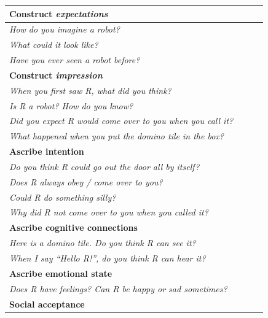 \documentclass{sig-alternate}
\begin{document}
\begin{table}[h]
\centering
\footnotesize
\begin{tabular}{p{0.9\linewidth}}
    \toprule
    \textbf{Construct \emph{expectations}} \\
    \midrule

    \emph{How do you imagine a robot?} \\
    \emph{What could it look like?} \\
    \emph{Have you ever seen a robot before?} \\

    \toprule
    \textbf{Construct \emph{impression}} \\
    \midrule


    \emph{When you first saw R, what did you think?} \\
    \emph{Is R a robot? How do you know?} \\
    \emph{Did you expect R would come over to you when you call it?} \\
    \emph{What happened when you put the domino tile in the box?} \\

    \toprule
    \textbf{Ascribe intention} \\
    \midrule


    \emph{Do you think R could go out the door all by itself?} \\	
    \emph{Does R always obey / come over to you?} \\
    \emph{Could R do something silly?} \\
    \emph{Why did R not come over to you when you called it?} \\

    \toprule
    \textbf{Ascribe cognitive connections} \\
    \midrule


    \emph{Here is a domino tile. Do you think R can see it?} \\ 
    \emph{When I say \textit{``Hello R!''}, do you think R can hear it?} \\

    \toprule
    \textbf{Ascribe emotional state} \\
    \midrule


    \emph{Does R have feelings? Can R be happy or sad sometimes?} \\

    \toprule
    \textbf{Social acceptance} \\
    \midrule



\end{tabular}
\end{table}
\end{document}
